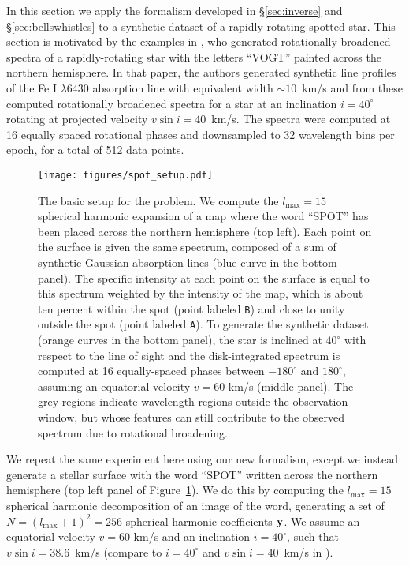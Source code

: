 \documentclass[modern]{aastex631}
\begin{document}
In this section we apply the formalism developed in \S\ref{sec:inverse} and \S\ref{sec:bellswhistles} to a synthetic dataset of a rapidly rotating spotted star. 
This section is motivated by the examples in \cite{Vogt1987}, who generated rotationally-broadened spectra of a rapidly-rotating star with the letters ``VOGT'' painted across the northern hemisphere. 
In that paper, the authors generated synthetic line profiles of the Fe I $\lambda 6430$ absorption line with equivalent width ${\sim}10$~km/s and from these computed rotationally broadened spectra for a star at an inclination $i=40^\circ$ rotating at projected velocity $v\sin i = 40$~km/s.
The spectra were computed at 16 equally spaced rotational phases and downsampled to 32 wavelength bins per epoch, for a total of 512 data points.

\begin{figure}[t!]
    \begin{centering}
        \texttt{[image: figures/spot\_setup.pdf]}
        \caption{%
            The basic setup for the \spot problem. 
            We compute the $l_\mathrm{max} = 15$ spherical harmonic expansion of a map where the word ``SPOT'' has been placed across the northern hemisphere (top left). 
            Each point on the surface is given the same spectrum, composed of a sum of synthetic Gaussian absorption lines (blue curve in the bottom panel).
            The specific intensity at each point on the surface is equal to this spectrum weighted by the intensity of the map, which is about ten percent within the spot (point labeled \texttt{B}) and close to unity outside the spot (point labeled \texttt{A}).
            To generate the synthetic dataset (orange curves in the bottom panel), the star is inclined at $40^\circ$ with respect to the line of sight and the disk-integrated spectrum is computed at 16 equally-spaced phases between $-180^\circ$ and $180^\circ$, assuming an equatorial velocity $v = 60$ km/s (middle panel).
            The grey regions indicate wavelength regions outside the observation window, but whose features can still contribute to the observed spectrum due to rotational broadening.
        }
        \label{fig:spot_setup}
    \end{centering}
\end{figure}

We repeat the same experiment here using our new formalism, except we instead generate a stellar surface with the word ``SPOT'' written across the northern hemisphere (top left panel of Figure~\ref{fig:spot_setup}).
We do this by computing the $l_\mathrm{max} = 15$ spherical harmonic decomposition of an image of the word, generating a set of $N = (l_\mathrm{max} + 1)^2 = 256$ spherical harmonic coefficients ${\mathbf{y}}$. 
We assume an equatorial velocity $v = 60$ km/s and an inclination $i = 40^\circ$, such that $v \sin i = 38.6$~km/s (compare to $i = 40^\circ$ and $v \sin i = 40$~km/s in \citealt{Vogt1987}).
\end{document}
